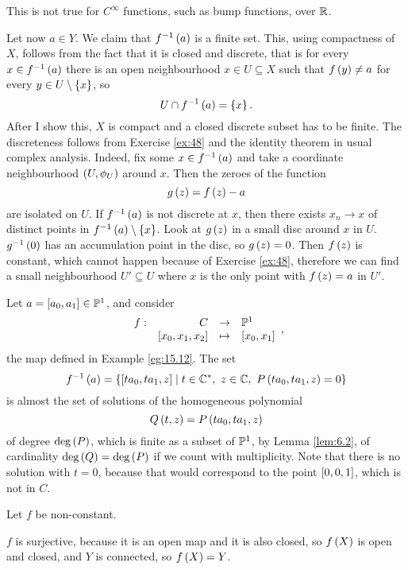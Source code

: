 \begin{remark*}
This is not true for $ C^\infty $ functions, such as bump functions, over $ \R $.
\end{remark*}

Let now $ a \in Y $. We claim that $ f^{-1}\rb{a} $ is a finite set. This, using compactness of $ X $, follows from the fact that it is closed and discrete, that is for every $ x \in f^{-1}\rb{a} $ there is an open neighbourhood $ x \in U \subseteq X $ such that $ f\rb{y} \ne a $ for every $ y \in U \setminus \cb{x} $, so
$$ U \cap f^{-1}\rb{a} = \cb{x}. $$
After I show this, $ X $ is compact and a closed discrete subset has to be finite. The discreteness follows from Exercise \ref{ex:48} and the identity theorem in usual complex analysis. Indeed, fix some $ x \in f^{-1}\rb{a} $ and take a coordinate neighbourhood $ \rb{U, \phi_U} $ around $ x $. Then the zeroes of the function
$$ g\rb{z} = f\rb{z} - a $$
are isolated on $ U $. If $ f^{-1}\rb{a} $ is not discrete at $ x $, then there exists $ x_n \to x $ of distinct points in $ f^{-1}\rb{a} \setminus \cb{x} $. Look at $ g\rb{z} $ in a small disc around $ x $ in $ U $. $ g^{-1}\rb{0} $ has an accumulation point in the disc, so $ g\rb{z} = 0 $. Then $ f\rb{z} $ is constant, which cannot happen because of Exercise \ref{ex:48}, therefore we can find a small neighbourhood $ U' \subseteq U $ where $ x $ is the only point with $ f\rb{z} = a $ in $ U' $.

\begin{example}
Let $ a = \sb{a_0, a_1} \in \P^1 $, and consider
$$ \function[f]{C}{\P^1}{\sb{x_0, x_1, x_2}}{\sb{x_0, x_1}}, $$
the map defined in Example \ref{eg:15.12}. The set
$$ f^{-1}\rb{a} = \cb{\sb{ta_0, ta_1, z} \mid t \in \C^*, \ z \in \C, \ P\rb{ta_0, ta_1, z} = 0} $$
is almost the set of solutions of the homogeneous polynomial
$$ Q\rb{t, z} = P\rb{ta_0, ta_1, z} $$
of degree $ \deg\rb{P} $, which is finite as a subset of $ \P^1 $, by Lemma \ref{lem:6.2}, of cardinality $ \deg\rb{Q} = \deg\rb{P} $ if we count with multiplicity. Note that there is no solution with $ t = 0 $, because that would correspond to the point $ \sb{0, 0, 1} $, which is not in $ C $.
\end{example}

Let $ f $ be non-constant.

\begin{remark*}
$ f $ is surjective, because it is an open map and it is also closed, so $ f\rb{X} $ is open and closed, and $ Y $ is connected, so $ f\rb{X} = Y $.
\end{remark*}

